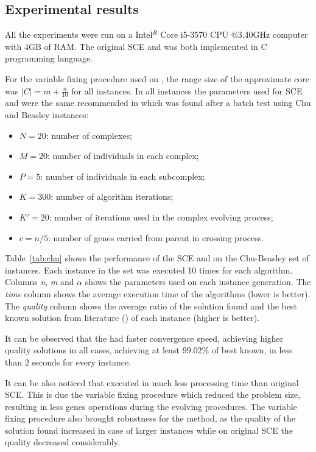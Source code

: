 \subsection{Experimental results}

All the experiments were run on a Intel$^R$ Core i5-3570 CPU @3.40GHz computer
with 4GB of RAM.
The original SCE and \scecore was both implemented in C programming language.

For the variable fixing procedure used on \scecore, the range size of the approximate core was
$|C| = m+\frac{n}{10}$ for all instances.
In all instances the parameters used for SCE and \scecore were the same recommended
in \cite{baroni2015shuffled} which was found after a batch test using Chu and Beasley instances:
\begin{itemize}
  \item $N = 20$: number of complexes;
  \item $M = 20$: number of individuals in each complex;
  \item $P = 5$: number of individuals in each subcomplex;
  \item $K = 300$: number of algorithm iterations;
  \item $K' = 20$: number of iterations used in the complex evolving process;
  \item $c = n/5$: number of genes carried from parent in crossing process.
\end{itemize}

Table~\ref{tab:chu} shows the performance of the SCE and \scecore on the Chu-Beasley set of instances.
Each instance in the set was executed 10 times for each algorithm.
Columns \textit{n}, \textit{m} and \textit{$\alpha$} shows the parameters used
on each instance generation.
The \textit{time} column shows the average execution time of the algorithms (lower is better).
The \textit{quality} column shows the average ratio of the solution found and
the best known solution from literature (\cite{vimont2008reduced, della2012improved}) of each instance (higher is better).

It can be observed that the \scecore had faster convergence speed, achieving higher
quality solutions in all cases, achieving at least $99.02\%$ of best known, in less than $2$ seconds
for every instance.

It can be also noticed that \scecore executed in much less processing time than original
SCE.
This is due the variable fixing procedure which reduced the problem size,
resulting in less genes operations during the evolving procedures.
The variable fixing procedure also brought robustness for the method, as the quality
of the solution found increased in case of larger instances while on original
SCE the quality decreased considerably.

